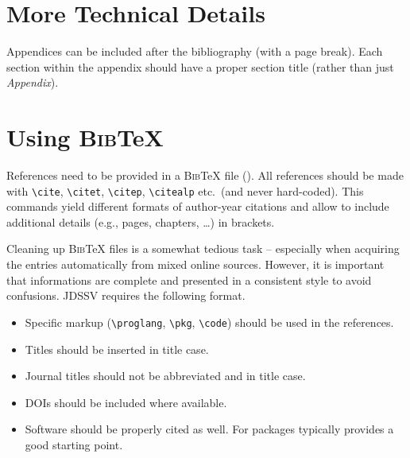 \documentclass[article]{jdssv}\usepackage[]{graphicx}\usepackage[]{color}
\begin{document}
\begin{appendix}

\section{More Technical Details} \label{app:technical}


Appendices can be included after the bibliography (with a page break). Each section within the appendix should have a proper section title (rather than just \emph{Appendix}).



\section[Using BibTeX]{Using \textsc{Bib}{\TeX}} \label{app:bibtex}

References need to be provided in a \textsc{Bib}{\TeX} file (). All references should be made with \verb|\cite|, \verb|\citet|, \verb|\citep|, \verb|\citealp| etc.\ (and never hard-coded). This commands yield different formats of author-year citations and allow to include additional details (e.g., pages, chapters, \dots) in brackets. 

Cleaning up \textsc{Bib}{\TeX} files is a somewhat tedious task -- especially when acquiring the entries automatically from mixed online sources. However, it is important that informations are complete and presented in a consistent style to avoid confusions. JDSSV requires the following format.
\begin{itemize}
  \item Specific markup (\verb|\proglang|, \verb|\pkg|, \verb|\code|) should
    be used in the references.
  \item Titles should be inserted in title case.
  \item Journal titles should not be abbreviated and in title case.
  \item DOIs should be included where available.
  \item Software should be properly cited as well. For  packages
     typically provides a good starting point.
\end{itemize}
\end{appendix}
\newpage
\end{document}
